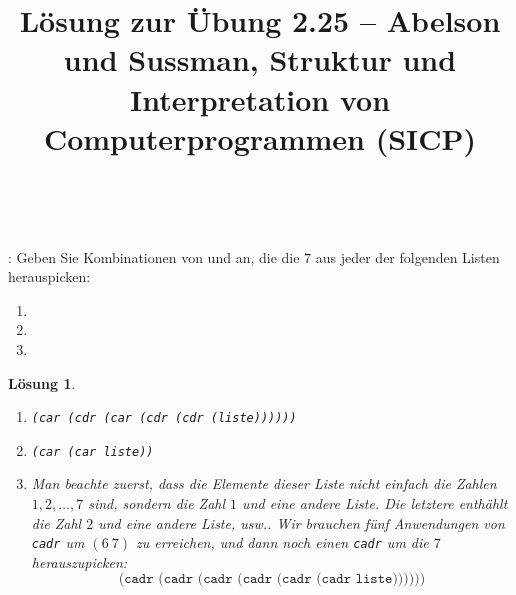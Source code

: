 \documentclass[a4paper,11pt,reqno]{amsart}
\theoremstyle{uremark}
\newtheorem*{loes}{L\"osung}
\begin{document}
\title[]{L\"osung zur \"Ubung 2.25 -- Abelson und Sussman, Struktur und
    Interpretation von Computerprogrammen (SICP)} 
\author{\href{https://github.com/pzuehlke}{}}
\maketitle
\

\noindent {}: Geben Sie Kombinationen von  und
 an, die die $ 7 $ aus jeder der folgenden Listen herauspicken:
\begin{enumerate}
    \item [(a)] 
    \item [(b)]  
    \item [(c)] 
\end{enumerate}

\begin{loes}\ 
\begin{enumerate}[label=\small$\bullet$]
    \item [(a)] \texttt{(car (cdr (car (cdr (cdr (liste))))))}
    \item [(b)] \texttt{(car (car liste))}
    \item [(c)] Man beachte zuerst, dass die Elemente dieser Liste nicht
        einfach die Zahlen $ 1, 2, \dots, 7 $ sind, sondern die Zahl $ 1 $ und
        eine andere Liste. Die letztere enth\"ahlt die Zahl $ 2 $ und eine
        andere Liste, usw.. Wir brauchen f\"unf Anwendungen von \texttt{cadr}
        um $ (6\ 7) $ zu erreichen, und dann noch einen \texttt{cadr} um die $
        7 $ herauszupicken:
        \begin{equation*}%
            \texttt{(cadr (cadr (cadr (cadr (cadr (cadr liste))))))}
        \end{equation*}
\end{enumerate}
\end{loes}
\end{document}
